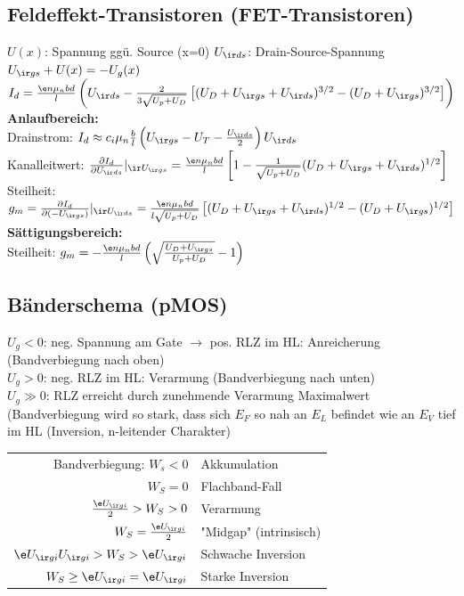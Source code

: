 \documentclass[fs, footer]{latex4ei}
\begin{document}
\begin{multicols*}{4}
\section{Feldeffekt-Transistoren (FET-Transistoren)}
$U(x)$: Spannung ggü. Source (x=0) \quad $U_{\ir ds}$: Drain-Source-Spannung\\
$U_{\ir gs} + U(x) = - U_g(x)$\\
$I_d = \frac{\e n\mu_nbd}{l}\left(U_{\ir ds}-\frac{2}{3\sqrt{U_p+U_D}}\left[(U_D+U_{\ir gs}+U_{\ir ds})^{3/2}-(U_D+U_{\ir gs})^{3/2}\right]\right)$\\
\textbf{Anlaufbereich:}\\
Drainstrom: $I_d \approx c_i\mu_n\frac{b}{l}\left(U_{\ir gs}-U_T-\frac{U_{\ir ds}}{2}\right)U_{\ir ds}$\\
Kanalleitwert: $\frac{\partial I_d}{\partial U_{\ir ds}}|_{\ir U_{\ir gs}} = \frac{\e n\mu_nbd}{l}\left[1-\frac{1}{\sqrt{U_p+U_D}}(U_D+U_{\ir gs}+U_{\ir ds})^{1/2}\right]$\\
Steilheit: $g_m =\frac{\partial I_d}{\partial (-U_{\ir gs})}|_{\ir U_{\ir ds}} =  \frac{\e n\mu_nbd}{l\sqrt{U_p+U_D}}\left[(U_D+U_{\ir gs}+U_{\ir ds})^{1/2}-(U_D+U_{\ir gs})^{1/2}\right]$\\
\textbf{Sättigungsbereich:}\\
Steilheit: $g_m = -\frac{\e n\mu_nbd}{l}\left(\sqrt{\frac{U_D+U_{\ir gs}}{U_p+U_D}}-1\right)$
\subsection{Bänderschema (pMOS)}
$U_g<0$: neg. Spannung am Gate $\rightarrow$ pos. RLZ im HL: Anreicherung (Bandverbiegung nach oben)\\
$U_g>0$: neg. RLZ im HL: Verarmung (Bandverbiegung nach unten)\\
$U_g\gg 0$: RLZ erreicht durch zunehmende Verarmung Maximalwert (Bandverbiegung wird so stark, dass sich $E_F$ so nah an $E_L$ befindet wie an $E_V$ tief im HL (Inversion, n-leitender Charakter)\\
\begin{tabular}{r|l}
Bandverbiegung: $W_s<0$ & Akkumulation\\
$W_S=0$ & Flachband-Fall\\
$\frac{\e U_{\ir gi}}{2}>W_S>0$ & Verarmung\\
$W_S=\frac{\e U_{\ir gi}}{2}$ & "Midgap" (intrinsisch)\\
$\e U_{\ir gi}U_{\ir gi}>W_S>\e U_{\ir gi}$ & Schwache Inversion\\
$W_S\geq \e U_{\ir gi}=\e U_{\ir gi}$ & Starke Inversion\\
\end{tabular}

\end{multicols*}
\end{document}
